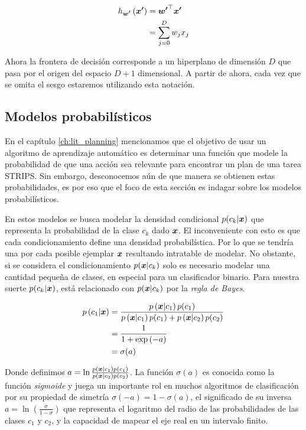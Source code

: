 \begin{align}
    h_{\boldsymbol{w'}}\left( \boldsymbol{x'} \right) &= \boldsymbol{w'}^{\top} \boldsymbol{x'}\\
                                           &= \sum_{j = 0 }^{D} w_j x_j
\end{align}

Ahora la frontera de decisión corresponde a un hiperplano de dimensión $D$ que
pasa por el origen del espacio $D + 1$ dimensional. A partir de ahora, cada vez
que se omita el sesgo estaremos utilizando esta notación.

\subsection{Modelos probabilísticos}
\label{subch:prob_models}

En el capítulo \ref{ch:lit_planning} mencionamos que el objetivo de usar un
algoritmo de aprendizaje automático es determinar una función que modele la
probabilidad de que una acción sea relevante para encontrar un plan de una tarea
STRIPS. Sin embargo, desconocemos aún de que manera se obtienen estas
probabilidades, es por eso que el foco de esta sección es indagar sobre los
modelos probabilísticos.

En estos modelos se busca modelar la densidad condicional $p(c_k | \boldsymbol{x})$
que representa la probabilidad de la clase $c_k$ dado $\boldsymbol{x}$. El
inconveniente con esto es que cada condicionamiento define una densidad
probabilística. Por lo que se tendría una por cada posible ejemplar $\boldsymbol{x}$
resultando intratable de modelar. No obstante, si se considera el
condicionamiento $p(\boldsymbol{x} | c_k)$ solo es necesario modelar una cantidad
pequeña de clases, en especial para un clasificador binario. Para nuestra suerte
$p(c_k | \boldsymbol{x})$, está relacionado con $p(\boldsymbol{x} | c_k)$ por la \emph{regla
de Bayes}.

\begin{align}
    p\left( c_1 | \boldsymbol{x} \right) &= \frac{p\left( \boldsymbol{x} | c_1 \right)p(c_1)}{
                                            p\left( \boldsymbol{x} | c_1 \right) p(c_1) + 
                                            p\left( \boldsymbol{x} | c_2 \right)p(c_2)} \\
                                   &= \frac{1}{1 + \exp\left( -a \right)} \\
                                   &= \sigma(a)
\end{align}

Donde definimos $a = \ln \frac{p\left( \boldsymbol{x} | c_1 \right) p\left( c_1
\right)}{p\left( \boldsymbol{x} | c_2 \right) p\left( c_2 \right)}$. La función
$\sigma(a)$ es conocida como la función \emph{sigmoide} y juega un importante
rol en muchos algoritmos de clasificación por su propiedad de simetría
$\sigma(-a) = 1 - \sigma(a)$, el significado de su inversa $a = \ln \left(
\frac{\sigma}{1 - \sigma} \right)$ que representa el logaritmo del radio de las
probabilidades de las clases $c_1$ y $c_2$, y la capacidad de mapear el eje real
en un intervalo finito.

